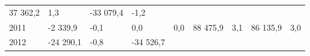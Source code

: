 \begin{longtable}[]{@{}lllllllll@{}}
\begin{minipage}[t]{0.12\columnwidth}
37 362,2\strut
\end{minipage} & \begin{minipage}[t]{0.06\columnwidth}\raggedright
1,3\strut
\end{minipage} & \begin{minipage}[t]{0.09\columnwidth}\raggedright
-33 079,4\strut
\end{minipage} & \begin{minipage}[t]{0.06\columnwidth}\raggedright
-1,2\strut
\end{minipage}\tabularnewline
\begin{minipage}[t]{0.05\columnwidth}\raggedright
2011\strut
\end{minipage} & \begin{minipage}[t]{0.10\columnwidth}\raggedright
-2 339,9\strut
\end{minipage} & \begin{minipage}[t]{0.06\columnwidth}\raggedright
-0,1\strut
\end{minipage} & \begin{minipage}[t]{0.16\columnwidth}\raggedright
0,0\strut
\end{minipage} & \begin{minipage}[t]{0.06\columnwidth}\raggedright
0,0\strut
\end{minipage} & \begin{minipage}[t]{0.12\columnwidth}\raggedright
88 475,9\strut
\end{minipage} & \begin{minipage}[t]{0.06\columnwidth}\raggedright
3,1\strut
\end{minipage} & \begin{minipage}[t]{0.09\columnwidth}\raggedright
86 135,9\strut
\end{minipage} & \begin{minipage}[t]{0.06\columnwidth}\raggedright
3,0\strut
\end{minipage}\tabularnewline
\begin{minipage}[t]{0.05\columnwidth}\raggedright
2012\strut
\end{minipage} & \begin{minipage}[t]{0.10\columnwidth}\raggedright
-24 290,1\strut
\end{minipage} & \begin{minipage}[t]{0.06\columnwidth}\raggedright
-0,8\strut
\end{minipage} & \begin{minipage}[t]{0.16\columnwidth}\raggedright
-34 526,7\strut
\end{minipage} & \begin{minipage}[t]{0.06\columnwidth}\raggedright

\end{minipage}
\end{longtable}
